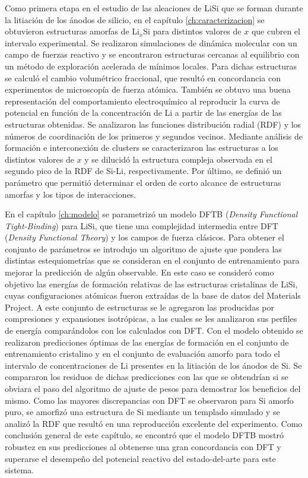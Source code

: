 Como primera etapa en el estudio de las aleaciones de LiSi que se forman durante
la litiación de los ánodos de silicio, en el capítulo \ref{ch:caracterizacion} se 
obtuvieron estructuras amorfas de Li$_x$Si para distintos valores de $x$ que 
cubren el intervalo experimental. Se realizaron simulaciones de 
dinámica molecular con un campo de fuerzas reactivo y se encontraron estructuras
cercanas al equilibrio con un método de exploración acelerada de mínimos locales.
Para dichas estructuras se calculó el cambio volumétrico fraccional, que resultó 
en concordancia con experimentos de microscopía de fuerza atómica. También se 
obtuvo una buena representación del comportamiento electroquímico al reproducir 
la curva de potencial en función de la concentración de Li a partir de las 
energías de las estructuras obtenidas. Se analizaron las funciones distribución 
radial (RDF) y los números de coordinación de los primeros y segundos vecinos. 
Mediante análisis de formación e interconexión de clusters se caracterizaron las 
estructuras a los distintos valores de $x$ y se dilucidó la estructura compleja 
observada en el segundo pico de la RDF de Si-Li, respectivamente. Por último, se 
definió un parámetro que permitió determinar el orden de corto alcance de 
estructuras amorfas y los tipos de interacciones.

En el capítulo \ref{ch:modelo} se parametrizó un modelo DFTB (\textit{Density 
Functional Tight-Binding}) para LiSi, que tiene una complejidad intermedia entre 
DFT (\textit{Density Functional Theory}) y los campos de fuerza clásicos. Para 
obtener el conjunto de parámetros se introdujo un algoritmo de ajuste que pondera
las distintas estequiometrías que se consideran en el conjunto de entrenamiento 
para mejorar la predicción de algún observable. En este caso se consideró como 
objetivo las energías de formación relativas de las estructuras cristalinas de 
LiSi, cuyas configuraciones atómicas fueron extraídas de la base de datos del Materials Project.
A este conjunto de estructuras se le agregaron las producidas por compresiones y 
expansiones isotrópicas, a las cuales se les analizaron sus perfiles de energía 
comparándolos con los calculados con DFT. Con el modelo obtenido se realizaron
predicciones óptimas de las energías de formación en el conjunto de entrenamiento 
cristalino y en el conjunto de evaluación amorfo para todo el intervalo de
concentraciones de Li presentes en la litiación de los ánodos de Si. Se compararon 
los residuos de dichas predicciones con las que se obtendrían si se obviara el 
paso del algoritmo de ajuste de pesos para demostrar los beneficios del mismo.
Como las mayores discrepancias con DFT se observaron para Si amorfo puro, se 
amorfizó una estructura de Si mediante un templado simulado y se analizó la RDF 
que resultó en una reproducción excelente del experimento. Como conclusión 
general de este capítulo, se encontró que el modelo DFTB mostró robustez en sus predicciones al
obtenerse una gran concordancia con DFT y superarse el desempeño del potencial 
reactivo del estado-del-arte para este sistema.

